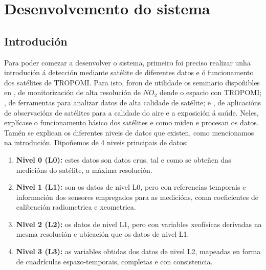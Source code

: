 \section{Desenvolvemento do sistema}\label{desenvolvemento}
\subsection{Introdución}
Para poder comezar a desenvolver o sistema, primeiro foi preciso realizar unha introdución á detección mediante satélite de diferentes datos e ó funcionamento dos satélites de TROPOMI. Para isto,
foron de utilidade os seminario dispoñibles en \cite{ARSETformation}, de monitorización de alta resolución de $NO_2$ dende o espacio con TROPOMI; \cite{ARSETtools}, de ferramentas para analizar
datos de alta calidade de satélite; e \cite{ARSETaplications}, de aplicacións de observacións de satélites para a calidade do aire e a exposición á saúde. Neles, explícase o funcionamento básico dos
satélites e como miden e procesan os datos. Tamén se explican os diferentes niveis de datos que existen, como mencionamos na \hyperref[introducion]{introdución}. Dipoñemos de 4 niveis principais de
datos:
\begin{enumerate}
    \item \textbf{Nivel 0 (L0):} estes datos son datos crus, tal e como se obteñen das medicións do satélite, a máxima resolución.
    \item \textbf{Nivel 1 (L1):} son os datos de nivel L0, pero con referencias temporais e información dos sensores empregados para as medicións, coma coeficientes de calibración radiometrica e
    xeometrica.
    \item \textbf{Nivel 2 (L2):} os datos de nivel L1, pero con variables xeofísicas derivadas na mesma resolución e ubicación que os datos de nivel L1.
    \item \textbf{Nivel 3 (L3):} as variables obtidas dos datos de nivel L2, mapeadas en forma de cuadrículas espazo-temporais, completas e con consistencia.
\end{enumerate}


